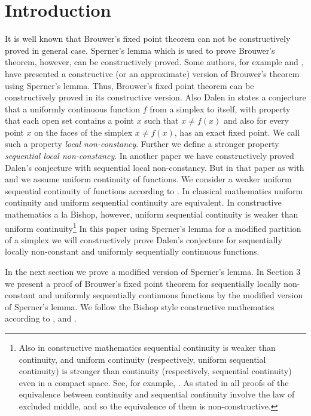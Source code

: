 \documentclass[reqno]{amsart}
\begin{document}
\section{Introduction}
It is well known that Brouwer's fixed point theorem can not be constructively proved in general case. Sperner's lemma which is used to prove Brouwer's theorem, however, can be constructively proved. Some authors, for example \cite{da} and \cite{veld}, have presented a constructive (or an approximate) version of Brouwer's theorem using Sperner's lemma. Thus, Brouwer's fixed point theorem can be constructively proved in its constructive version. Also Dalen in \cite{da} states a conjecture that a uniformly continuous function $f$ from a simplex to itself, with property that each open set contains a point $x$ such that $x\neq f(x)$ and also for every point $x$ on the faces of the simplex $x\neq f(x)$, has an exact fixed point. We call such a property \emph{local non-constancy}. Further we define a stronger property \emph{sequential local non-constancy}. In another paper \cite{ta1} we have constructively proved Dalen's conjecture with sequential local non-constancy. But in that paper as with \cite{da} and \cite{veld} we assume uniform continuity of functions. We consider a weaker uniform sequential continuity of functions according to \cite{br2}. In classical mathematics uniform continuity and uniform sequential continuity are equivalent. In constructive mathematics a la Bishop, however, uniform sequential continuity is weaker than uniform continuity\footnote{Also in constructive mathematics sequential continuity is weaker than continuity, and uniform continuity (respectively, uniform sequential continuity) is stronger than continuity (respectively, sequential continuity) even in a compact space. See, for example, \cite{ishi}. As stated in \cite{bm} all proofs of the equivalence between continuity and sequential continuity involve the law of excluded middle, and so the equivalence of them is non-constructive.} In this paper using Sperner's lemma for a modified partition of a simplex we will constructively prove Dalen's conjecture for sequentially locally non-constant and uniformly sequentially continuous functions.

In the next section we prove a modified version of Sperner's lemma. In Section 3 we present a proof of Brouwer's fixed point theorem for sequentially locally non-constant and uniformly sequentially continuous functions by the modified version of Sperner's lemma. We follow the Bishop style constructive mathematics according to \cite{bb}, \cite{br} and \cite{bv}.
\end{document}
